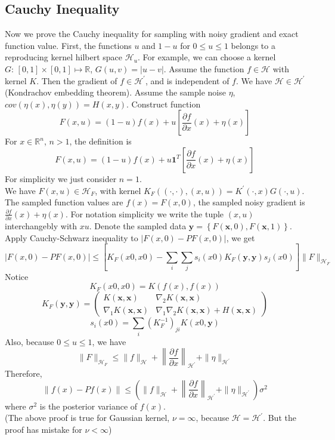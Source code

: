 \documentclass[a4paper,onecolumn]{article}
\begin{document}
\subsection{Cauchy Inequality}
\noindent Now we prove the Cauchy inequality for sampling with noisy gradient and exact function value.
First, the functions $u$ and $1-u$ for $0\le u\le 1$
belongs to a reproducing kernel hilbert space $\mathcal{H}_u$. For example, we can choose a kernel $G:\, [0,1]\times [0,1] \mapsto \mathbb{R}$, $G(u,v) = |u-v|$.
Assume the function $f\in \mathcal{H}$ with kernel $K$. 
Then the gradient of $f\in \mathcal{H}^\prime$, and is independent of $f$. We have $\mathcal{H} \in \mathcal{H}^\prime$ (Kondrachov embedding theorem).
Assume the sample noise $\eta$,
$cov(\eta(x),\eta(y)) = H(x,y)$.
Construct function 
\begin{equation*}
    F(x,u) = (1-u) f(x) + u \left[\frac{\partial f}{\partial x}(x) + \eta(x) \right]
\end{equation*}
For $x\in \mathbb{R}^n$, $n>1$, the definition is 
\begin{equation*}
    F(x,u) = (1-u) f(x) + u \mathbf{1}^T\left[\frac{\partial f}{\partial x}(x) + \eta(x) \right]
\end{equation*}
For simplicity we just consider $n=1$.\\
We have $F(x,u) \in \mathcal{H}_F$, with kernel $K_F\left((\cdot,\cdot),(x,u)\right) = K^\prime(\cdot, x) G(\cdot, u)$.
The sampled function values are $f(x) = F(x,0)$, the sampled noisy gradient is $\frac{\partial f}{\partial x}(x) + \eta(x)$.
For notation simplicity we write the tuple $(x,u)$ interchangebly with $xu$. Denote the sampled data
$\mathbf{y}=\left\{F(\mathbf{x},0), F(\mathbf{x},1)\right\}$.
Apply Cauchy-Schwarz inequality to $\left|F(x,0) - PF(x,0)\right|$, we get
\begin{equation*}
    \left|F(x,0) - PF(x,0)\right| \le \left[
        K_F(x0,x0) - \sum_i\sum_j s_i(x0) K_F(\mathbf{y},\mathbf{y}) s_j(x0)
    \right] \|F\|_{\mathcal{H}_F}
\end{equation*}
Notice
$$
    K_F(x0,x0) = K(f(x),f(x))
$$
\begin{equation*}
    K_F(\mathbf{y},\mathbf{y}) = 
    \begin{pmatrix}
        K(\mathbf{x}, \mathbf{x}) & \nabla_2 K(\mathbf{x}, \mathbf{x})\\
        \nabla_1 K(\mathbf{x}, \mathbf{x}) & \nabla_1 \nabla_2 K(\mathbf{x},\mathbf{x})+H(\mathbf{x},\mathbf{x})
    \end{pmatrix}
\end{equation*}
$$
    s_i(x0) = \sum_i (K_F^{-1})_{ji} K(x0, \mathbf{y})
$$
Also, because $0\le u\le 1$, we have
$$
    \|F\|_{\mathcal{H}_F} \le  \|f\|_\mathcal{H} + \left\|\frac{\partial f}{\partial x}\right\|_{\mathcal{H}^\prime} + \|\eta \|_{\mathcal{H}^\prime}
$$
Therefore,
$$
    \|f(x) - Pf(x)\| \le \left( \|f\|_\mathcal{H} + \left\|\frac{\partial f}{\partial x}\right\|_{\mathcal{H}^\prime} + \|\eta \|_{\mathcal{H}^\prime} \right) \sigma^2
$$
where $\sigma^2$ is the posterior variance of $f(x)$.\\

\noindent (The above proof is true for Gaussian kernel, $\nu=\infty$, because $\mathcal{H}=\mathcal{H}^\prime$. But the proof has mistake for $\nu<\infty$)
\end{document}
